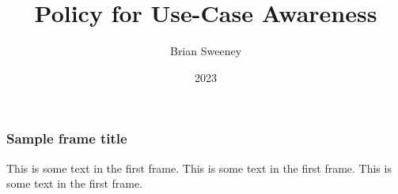 \documentclass{beamer}
\title{Policy for Use-Case Awareness}
\author{Brian Sweeney}
\institute{Production Engineering (SRE) }
\date{2023}
\begin{document}
\frame{\titlepage}

\begin{frame}
\frametitle{Sample frame title}
This is some text in the first frame. This is some text in the first frame. This is some text in the first frame.
\end{frame}
\end{document}
